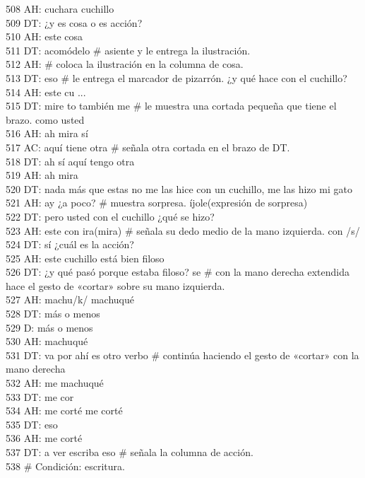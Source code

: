 508 AH: cuchara cuchillo\\
509 DT: ¿y es cosa o es acción?\\
510 AH: este cosa\\
511 DT: acomódelo \# asiente y le entrega la ilustración.\\
512 AH: \# coloca la ilustración en la columna de cosa.\\
513 DT: eso \# le entrega el marcador de pizarrón. ¿y qué hace con el cuchillo?\\
514 AH: este cu ...\\
515 DT: mire to también me \# le muestra una cortada pequeña que tiene el brazo. como usted\\
516 AH: ah mira sí\\
517 AC: aquí tiene otra \# señala otra cortada en el brazo de DT.\\
518 DT: ah sí aquí tengo otra\\
519 AH: ah mira\\
520 DT: nada más que estas no me las hice con un cuchillo, me las hizo mi gato\\
521 AH: ay ¿a poco? \# muestra sorpresa. íjole(expresión de sorpresa)\\
522 DT: pero usted con el cuchillo ¿qué se hizo?\\
523 AH: este con ira(mira) \# señala su dedo medio de la mano izquierda. con /s/\\
524 DT: sí ¿cuál es la acción?\\
525 AH: este cuchillo está bien filoso\\
526 DT: ¿y qué pasó porque estaba filoso? se \# con la mano derecha extendida hace el gesto de «cortar» sobre su mano izquierda.\\
527 AH: machu/k/ machuqué\\
528 DT: más o menos\\
529 D: más o menos\\
530 AH: machuqué\\
531 DT: va por ahí es otro verbo \# continúa haciendo el gesto de «cortar» con la mano derecha\\
532 AH: me machuqué\\
533 DT: me cor\\
534 AH: me corté me corté\\
535 DT: eso\\
536 AH: me corté\\
537 DT: a ver escriba eso \# señala la columna de acción.\\
538 \# Condición: escritura.\\
